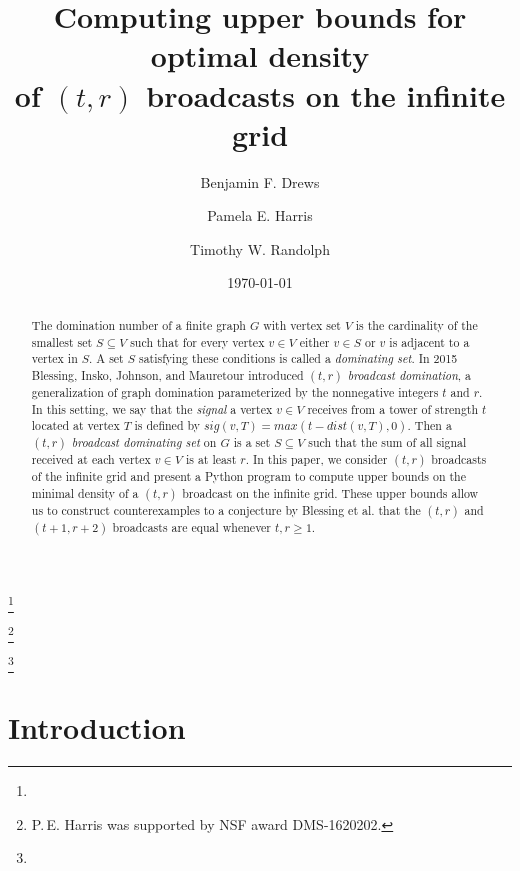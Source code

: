 \documentclass[12pt]{amsart}
\newcounter{x}
\newcounter{y}
\newcounter{x2}
\newcounter{y2}
\begin{document}
\title{Computing upper bounds for optimal density \\of $(t,r)$ broadcasts on the infinite grid}

\author{Benjamin F. Drews}
\address{Department of Mathematics and Statistics, Williams College, United States}
\thanks{}

\author{Pamela E. Harris}
\address{Department of Mathematics and Statistics, Williams College, United States}
\thanks{P.\,E. Harris was supported by NSF award DMS-1620202.}

\author{Timothy W. Randolph}
\address{Department of Mathematics and Statistics, Williams College, United States}
\thanks{}

\date{\today}

\maketitle
\begin{abstract}
%
The domination number of a finite graph $G$ with vertex set $V$ is the cardinality of the smallest set $S\subseteq V$ such that for every vertex $v\in V$ either $v\in S$ or $v$ is adjacent to a vertex in $S$. A set $S$ satisfying these conditions is called a \emph{dominating set}. In 2015 Blessing, Insko, Johnson, and Mauretour introduced \emph{$(t,r)$ broadcast domination}, a generalization of graph domination parameterized by the nonnegative integers $t$ and $r$. In this setting, we say that the \emph{signal} a vertex $v\in V$ receives from a tower of strength $t$ located at vertex $T$ is defined by $sig(v,T)=max(t-dist(v,T),0)$. Then a \emph{$(t,r)$ broadcast dominating set} on $G$ is a set $S\subseteq V$ such that the sum of all signal received at each vertex $v \in V$ is at least $r$.  In this paper, we consider $(t,r)$ broadcasts of the infinite grid and present a Python program to compute upper bounds on the minimal density of a $(t,r)$ broadcast on the infinite grid. These upper bounds allow us to construct counterexamples to a conjecture by Blessing et al. that the $(t,r)$ and $(t+1, r+2)$ broadcasts are equal whenever $t,r\geq 1$.
\end{abstract}




\section{Introduction}
\end{document}
